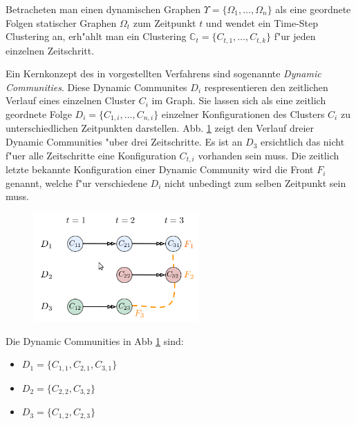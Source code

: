 \documentclass[journal]{vgtc}
\begin{document}
    Betracheten man einen dynamischen Graphen $\Upsilon = \{ \Omega_1, \dots, \Omega_n \}$ als eine geordnete Folgen statischer
    Graphen $\Omega_t$ zum Zeitpunkt $t$ und wendet ein Time-Step Clustering an, erh"ahlt man ein Clustering
    $\mathbb{C}_t = \{ C_{t,1}, \dots, C_{t,k}\}$ f"ur jeden einzelnen Zeitschritt.
    
    Ein Kernkonzept des in \cite{timestep} vorgestellten Verfahrens sind sogenannte \emph{Dynamic Communities}. Diese Dynamic
    Communites $D_i$ respresentieren den zeitlichen Verlauf eines einzelnen Cluster $C_i$ im Graph. Sie lassen sich als eine zeitlich 
    geordnete Folge $D_i = \{ C_{1,i}, \dots, C_{n,i} \}$ einzelner Konfigurationen des Clusters $C_i$ zu unterschiedlichen Zeitpunkten
    darstellen. Abb. \ref{fig:dynamic1} zeigt den Verlauf dreier Dynamic Communities "uber drei Zeitschritte. Es ist an $D_3$ ersichtlich das
    nicht f"uer alle Zeitschritte eine Konfiguration $C_{t,i}$ vorhanden sein muss. Die zeitlich letzte bekannte Konfiguration
    einer Dynamic Community wird die Front $F_i$ genannt, welche f"ur verschiedene $D_i$ nicht unbedingt zum selben Zeitpunkt sein muss.
    \begin{figure}[h]
      \centering
      \includegraphics[width=2.5in]{images/dynamic_communities1}
      \caption{\label{fig:dynamic1}\cite{timestep}}
    \end{figure}
    
    Die Dynamic Communities in Abb \ref{fig:dynamic1} sind:
    \begin{itemize}
      \item $D_1 =\{C_{1,1}, C_{2,1}, C_{3,1}\}$
      \item $D_2 =\{C_{2,2}, C_{3,2}\}$
      \item $D_3 =\{C_{1,2}, C_{2,3}\}$
    \end{itemize}
    
\end{document}
